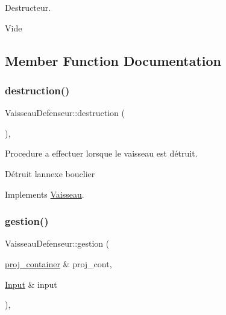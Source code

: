 Destructeur. 

Vide 

\subsection{Member Function Documentation}
\mbox{\label{class_vaisseau_defenseur_aeaaaa161533c6aa07b627172d8657b3a}} 
\subsubsection{\texorpdfstring{destruction()}{destruction()}}
{\footnotesize\ttfamily Vaisseau\+Defenseur\+::destruction (\begin{DoxyParamCaption}{ }\end{DoxyParamCaption})\hspace{0.3cm}{\ttfamily [override]}, {\ttfamily [virtual]}}



Procedure a effectuer lorsque le vaisseau est détruit. 

Détruit l\textquotesingle{}annexe bouclier 

Implements \mbox{\hyperlink{class_vaisseau_a6d7506acb12c0367989066c899ec7949}{Vaisseau}}.

\mbox{\label{class_vaisseau_defenseur_a9d8301faaaebc09dd5e807e8ebe829ae}} 
\subsubsection{\texorpdfstring{gestion()}{gestion()}}
{\footnotesize\ttfamily Vaisseau\+Defenseur\+::gestion (\begin{DoxyParamCaption}\item[{\mbox{\hyperlink{def__type_8h_a87980cd8ee9533e561a73e8bbc728188}{proj\+\_\+container}} \&}]{proj\+\_\+cont,  }\item[{\mbox{\hyperlink{_input_8h_a5588d60d674991c719a8df848313e966}{Input}} \&}]{input }\end{DoxyParamCaption})\hspace{0.3cm}{\ttfamily [override]}, {\ttfamily [virtual]}}



